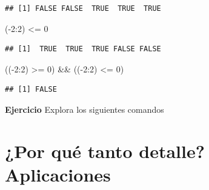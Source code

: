 \documentclass[]{article}
\newenvironment{Shaded}{\begin{snugshade}}{\end{snugshade}}
\newcommand{\KeywordTok}[1]{\textcolor[rgb]{0.13,0.29,0.53}{\textbf{{#1}}}}
\newcommand{\DecValTok}[1]{\textcolor[rgb]{0.00,0.00,0.81}{{#1}}}
\newcommand{\FloatTok}[1]{\textcolor[rgb]{0.00,0.00,0.81}{{#1}}}
\newcommand{\StringTok}[1]{\textcolor[rgb]{0.31,0.60,0.02}{{#1}}}
\newcommand{\NormalTok}[1]{{#1}}
\begin{document}
\begin{verbatim}
## [1] FALSE FALSE  TRUE  TRUE  TRUE
\end{verbatim}

\begin{Shaded}
\begin{Highlighting}[]
\NormalTok{(-}\DecValTok{2}\NormalTok{:}\DecValTok{2}\NormalTok{) <=}\StringTok{ }\DecValTok{0}
\end{Highlighting}
\end{Shaded}

\begin{verbatim}
## [1]  TRUE  TRUE  TRUE FALSE FALSE
\end{verbatim}

\begin{Shaded}
\begin{Highlighting}[]
\NormalTok{((-}\DecValTok{2}\NormalTok{:}\DecValTok{2}\NormalTok{) >=}\StringTok{ }\DecValTok{0}\NormalTok{) &&}\StringTok{ }\NormalTok{((-}\DecValTok{2}\NormalTok{:}\DecValTok{2}\NormalTok{) <=}\StringTok{ }\DecValTok{0}\NormalTok{)}
\end{Highlighting}
\end{Shaded}

\begin{verbatim}
## [1] FALSE
\end{verbatim}

\textbf{Ejercicio} Explora los siguientes comandos

\begin{Shaded}
\end{Shaded}

\section{¿Por qué tanto detalle?
Aplicaciones}\label{por-que-tanto-detalle-aplicaciones}
\end{document}
